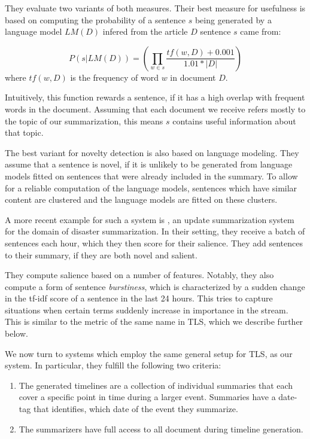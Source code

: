 \documentclass[a4paper,BCOR=10mm]{report}
\numberwithin{lemma}{chapter}
\numberwithin{definition}{chapter}
\begin{document}
They evaluate two variants of both measures.
Their best measure for usefulness is based on computing the probability of a sentence $s$ being generated by a language model $LM(D)$ infered from the article $D$ sentence $s$ came from:

\begin{equation}
P(s|LM(D)) = (\prod_{w \in s} \frac{\mathit{tf}(w, D) + 0.001}{1.01 * |D|})
\end{equation}
where $\mathit{tf(w, D)}$ is the frequency of word $w$ in document $D$.

Intuitively, this function rewards a sentence, if it has a high overlap with frequent words in the document. Assuming that each document we receive refers mostly to the topic of our summarization, this means $s$ contains useful information about that topic.

The best variant for novelty detection is also based on language modeling.
They assume that a sentence is novel, if it is unlikely to be generated from language models fitted on sentences that were already included in the summary. To allow for a reliable computation of the language models, sentences which have similar content are clustered and the language models are fitted on these clusters.

A more recent example for such a system is \citet{salient-updates}, an update summarization system for the domain of disaster summarization.
In their setting, they receive a batch of sentences each hour, which they then score for their salience. They add sentences to their summary, if they are both novel and salient.

They compute salience based on a number of features. Notably, they also compute a form of sentence \textit{burstiness}, which is characterized by a sudden change in the tf-idf score of a sentence in the last 24 hours. This tries to capture situations when certain terms suddenly increase in importance in the stream. This is similar to the metric of the same name in TLS, which we describe further below.

We now turn to systems which employ the same general setup for TLS, as our system. In particular, they fulfill the following two criteria:

\begin{enumerate}
    \item{The generated timelines are a collection of individual summaries that each cover a specific point in time during a larger event. Summaries have a date-tag that identifies, which date of the event they summarize.}
    \item{The summarizers have full access to all document during timeline generation.}
\end{enumerate}
\end{document}
